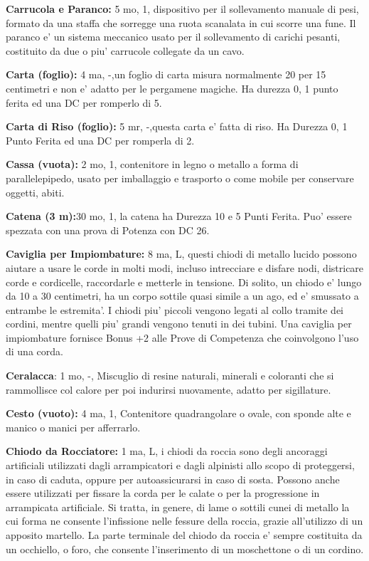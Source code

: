\documentclass[a4paper,11pt,twoside,openany]{book}
\begin{document}
{		\textbf{Carrucola e Paranco:} 5 mo, 1, dispositivo per il sollevamento manuale di pesi, formato da una staffa che sorregge una ruota scanalata in cui scorre una fune. Il paranco e' un sistema meccanico usato per il sollevamento di carichi pesanti, costituito da due o piu' carrucole collegate da un cavo.
		
		\textbf{Carta (foglio):} 4 ma, -,un foglio di carta misura normalmente 20 per 15 centimetri e non e' adatto per le pergamene magiche. Ha durezza 0, 1 punto ferita ed una DC per romperlo di 5.
		
		\textbf{Carta di Riso (foglio):} 5 mr, -,questa carta e' fatta di riso. Ha Durezza 0, 1 Punto Ferita ed una DC per romperla di 2.
		
		\textbf{Cassa (vuota):} 2 mo, 1, contenitore in legno o metallo a forma di parallelepipedo, usato per imballaggio e trasporto o come mobile per conservare oggetti, abiti. 
		
		\textbf{Catena (3 m):}30 mo, 1, la catena ha Durezza 10 e 5 Punti Ferita. Puo' essere spezzata con una prova di Potenza con DC 26.
		
		\textbf{Caviglia per Impiombature:} 8 ma, L, questi chiodi di metallo lucido possono aiutare a usare le corde in molti modi, incluso intrecciare e disfare nodi, districare corde e cordicelle, raccordarle e metterle in tensione. Di solito, un chiodo e' lungo da 10 a 30 centimetri, ha un corpo sottile quasi simile a un ago, ed e' smussato a entrambe le estremita'. I chiodi piu' piccoli vengono legati al collo tramite dei cordini, mentre quelli piu' grandi vengono tenuti in dei tubini. Una caviglia per impiombature fornisce Bonus +2 alle Prove di Competenza che coinvolgono l'uso di una corda. 
		
		\textbf{Ceralacca}: 1 mo, -, Miscuglio di resine naturali, minerali e coloranti che si rammollisce col calore per poi indurirsi nuovamente, adatto per sigillature.
		
		\textbf{Cesto (vuoto):} 4 ma, 1, Contenitore quadrangolare o ovale, con sponde alte e manico o manici per afferrarlo.
		
		\textbf{Chiodo da Rocciatore:} 1 ma, L, i chiodi da roccia sono degli ancoraggi artificiali utilizzati dagli arrampicatori e dagli alpinisti allo scopo di proteggersi, in caso di caduta, oppure per autoassicurarsi in caso di sosta. Possono anche essere utilizzati per fissare la corda per le calate o per la progressione in arrampicata artificiale. Si tratta, in genere, di lame o sottili cunei di metallo la cui forma ne consente l'infissione nelle fessure della roccia, grazie all'utilizzo di un apposito martello. La parte terminale del chiodo da roccia e' sempre costituita da un occhiello, o foro, che consente l'inserimento di un moschettone o di un cordino.
		
}
\end{document}
